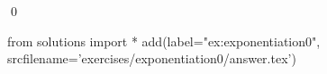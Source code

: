
\begin{ex} 
  \label{ex:exponentiation0}
  
  \qed
\end{ex} 
\begin{python0}
from solutions import *
add(label="ex:exponentiation0",
    srcfilename='exercises/exponentiation0/answer.tex') 
\end{python0}
